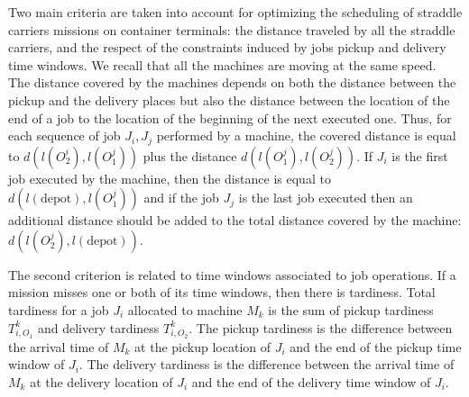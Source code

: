 \documentclass[a4paper,12pt]{article}
\begin{document}
Two main criteria are taken into account for optimizing the scheduling of straddle carriers missions on container terminals: the distance traveled by all the straddle carriers, and the respect of the constraints induced by jobs pickup and delivery time windows. We recall that all the machines are moving at the same speed. \\

The distance covered by the machines depends on both the distance between the pickup and the delivery places but also the distance between the location of the end of a job to the location of the beginning of the next executed one. Thus, for each sequence of job $J_i,J_j$ performed by a machine, the covered distance is equal to $d(l(O^i_2), l(O^j_1))$ plus the distance $d(l(O^j_1), l(O^j_2))$. If $J_i$ is the first job executed by the machine, then the distance is equal to $d(l(\mbox{depot}),l(O^j_1))$ and if the job $J_j$ is the last job executed then an additional distance should be added to the total distance covered by the machine: $d(l(O^j_2),l(\mbox{depot}))$.

%


%

The second criterion is related to time windows associated to job operations. If a mission misses one or both of its time windows, then there is tardiness. Total tardiness for a job $J_i$ allocated to machine $M_k$ is the sum of pickup tardiness $T^k_{i,O_1}$ and delivery tardiness $T^k_{i,O_2}$. The pickup tardiness is the difference between the arrival time of $M_k$ at the pickup location of $J_i$ and the end of the pickup time window of $J_i$. The delivery tardiness is the difference between the arrival time of $M_k$ at the delivery location of $J_i$ and the end of the delivery time window of $J_i$. \\
\end{document}
